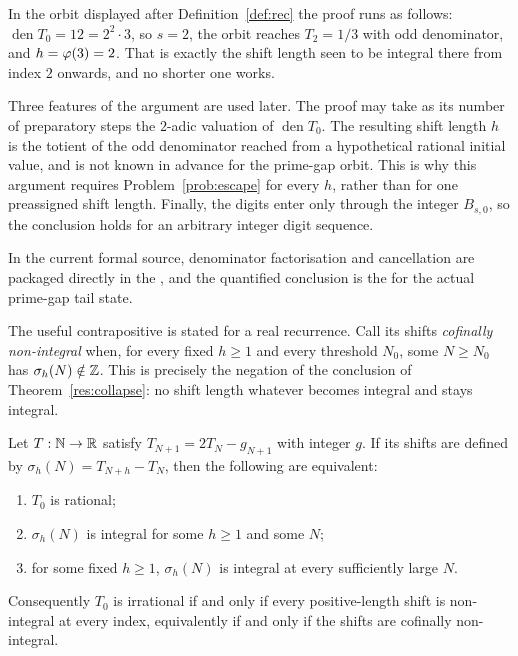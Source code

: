 \documentclass[11pt]{article}
\begin{document}
In the orbit displayed after Definition~\ref{def:rec} the proof runs as
follows: $\operatorname{den}T_0=12=2^{2}\cdot3$, so $s=2$, the orbit reaches
$T_2=1/3$ with odd denominator, and $h=\varphi(3)=2$.  That is exactly the shift
length seen to be integral there from index $2$ onwards, and no shorter one
works.

Three features of the argument are used later.  The proof may take as its
number of preparatory steps the $2$-adic valuation of
$\operatorname{den}T_0$.  The resulting shift length $h$ is the totient of the
odd denominator reached from a hypothetical rational initial value, and is
not known in advance for the prime-gap orbit.  This is why this argument
requires Problem~\ref{prob:escape} for every $h$, rather than for one
preassigned shift length.  Finally, the digits enter only through the integer
$B_{s,0}$, so the conclusion holds for an arbitrary integer digit sequence.

\noindent In the current formal source, denominator factorisation and
cancellation are packaged directly in the
, and the quantified conclusion is the
 for the actual prime-gap tail state.

The useful contrapositive is stated for a real recurrence.  Call its shifts
\emph{cofinally non-integral} when, for every fixed $h\ge1$ and every
threshold $N_0$, some $N\ge N_0$ has $\sigma_h(N)\notin\mathbb{Z}$.  This is precisely
the negation of the conclusion of Theorem~\ref{res:collapse}: no shift length
whatever becomes integral and stays integral.

\begin{theorem}\label{res:escape-irrational}
Let $T:\mathbb{N}\to\mathbb{R}$ satisfy $T_{N+1}=2T_N-g_{N+1}$ with integer $g$.  If its
shifts are defined by $\sigma_h(N)=T_{N+h}-T_N$, then the following are
equivalent:
\begin{enumerate}[label=\textup{(\roman*)}]
\item $T_0$ is rational;
\item $\sigma_h(N)$ is integral for some $h\ge1$ and some $N$;
\item for some fixed $h\ge1$, $\sigma_h(N)$ is integral at every sufficiently
  large $N$.
\end{enumerate}
Consequently $T_0$ is irrational if and only if every positive-length shift
is non-integral at every index, equivalently if and only if the shifts are
cofinally non-integral.
\end{theorem}
\end{document}
